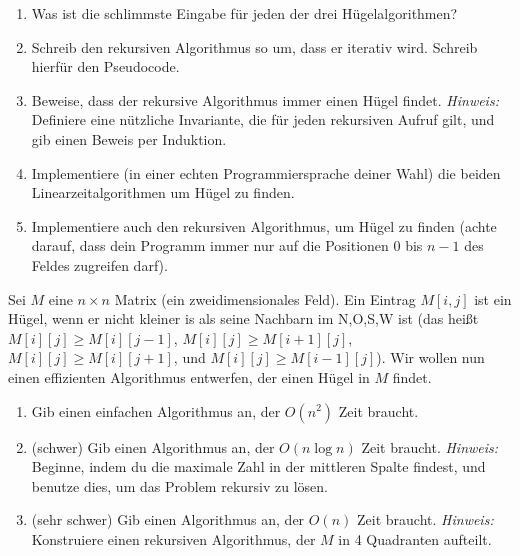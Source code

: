 \documentclass{uebung_cs}
\begin{document}
\begin{aufgabe}\label{thu-last}\mbox{}
	\begin{enumerate}
		\item Was ist die schlimmste Eingabe für jeden der drei Hügelalgorithmen?
		\item Schreib den rekursiven Algorithmus so um, dass er iterativ wird. Schreib hierfür den Pseudocode.
		\item Beweise, dass der rekursive Algorithmus immer einen Hügel findet. \emph{Hinweis:} Definiere eine nützliche Invariante, die für jeden rekursiven Aufruf gilt, und gib einen Beweis per Induktion.
		\item Implementiere (in einer echten Programmiersprache deiner Wahl) die beiden Linearzeitalgorithmen um Hügel zu finden.
		\item Implementiere auch den rekursiven Algorithmus, um Hügel zu finden (achte darauf, dass dein Programm immer nur auf die Positionen $0$ bis $n-1$ des Feldes zugreifen darf).
	\end{enumerate}
\end{aufgabe}


\begin{aufgabe}\label{star}
	Sei $M$ eine $n\times n$ Matrix (ein zweidimensionales Feld).
	Ein Eintrag $M[i,j]$ ist ein Hügel, wenn er nicht kleiner is als seine Nachbarn im N,O,S,W ist (das heißt $M[i][j]\ge M[i][j-1]$, $M[i][j]\ge M[i+1][j]$, $M[i][j]\ge M[i][j+1]$, und $M[i][j]\ge M[i-1][j]$).
	Wir wollen nun einen effizienten Algorithmus entwerfen, der einen Hügel in $M$ findet.
	\begin{enumerate}
		\item Gib einen einfachen Algorithmus an, der $O(n^2)$ Zeit braucht.
		\item (schwer) Gib einen Algorithmus an, der $O(n \log n)$ Zeit braucht. \emph{Hinweis:} Beginne, indem du die maximale Zahl in der mittleren Spalte findest, und benutze dies, um das Problem rekursiv zu lösen.
		\item (sehr schwer) Gib einen Algorithmus an, der $O(n)$ Zeit braucht. \emph{Hinweis:} Konstruiere einen rekursiven Algorithmus, der $M$ in 4 Quadranten aufteilt.
	\end{enumerate}
\end{aufgabe}
\end{document}
